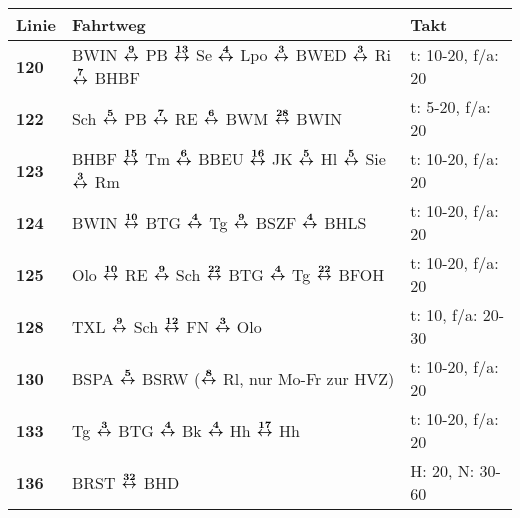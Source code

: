 \begin{minipage}[t]{0.05\textwidth}
\phantom{Tor}
\end{minipage}
\begin{minipage}[t]{0.45\textwidth}
\begin{tabular}{>{\bfseries}L{1.2cm}L{9.0cm}L{3.0cm}}
{\bfseries Linie} & {\bfseries Fahrtweg} & {\bfseries Takt} \\
\hline
\bus{} 120    & BWIN $\xarwe{9}$ PB $\xarwe{13}$ Se $\xarwe{4}$ Lpo $\xarwe{3}$ BWED $\xarwe{3}$ Ri $\xarwe{7}$ BHBF                                                                & t: 10-20, f/a: 20          \\
\bus{} 122    & Sch $\xarwe{5}$ PB $\xarwe{7}$ RE $\xarwe{6}$ BWM $\xarwe{28}$ BWIN                                                                                                 & t: 5-20, f/a: 20           \\
\bus{} 123    & BHBF $\xarwe{15}$ Tm $\xarwe{6}$ BBEU $\xarwe{16}$ JK $\xarwe{5}$ Hl $\xarwe{5}$ Sie $\xarwe{3}$ Rm                                                                 & t: 10-20, f/a: 20          \\
\bus{} 124    & BWIN $\xarwe{10}$ BTG $\xarwe{4}$ Tg $\xarwe{9}$ BSZF $\xarwe{4}$ BHLS                                                                                              & t: 10-20, f/a: 20          \\
\bus{} 125    & Olo $\xarwe{10}$ RE $\xarwe{9}$ Sch $\xarwe{22}$ BTG $\xarwe{4}$ Tg $\xarwe{22}$ BFOH                                                                               & t: 10-20, f/a: 20          \\
\bus{} 128    & TXL $\xarwe{9}$ Sch $\xarwe{12}$ FN $\xarwe{3}$ Olo                                                                                                                 & t: 10, f/a: 20-30          \\
\bus{} 130    & BSPA $\xarwe{5}$ BSRW ($\xarwe{8}$ Rl, nur Mo-Fr zur HVZ)                                                                                                           & t: 10-20, f/a: 20          \\
\bus{} 133    & Tg $\xarwe{3}$ BTG $\xarwe{4}$ Bk $\xarwe{4}$ Hh $\xarwe{17}$ Hh                                                                                                    & t: 10-20, f/a: 20          \\
\bus{} 136    & BRST $\xarwe{32}$ BHD                                                                                                                                               & H: 20, N: 30-60            \\

\end{tabular}
\end{minipage}
